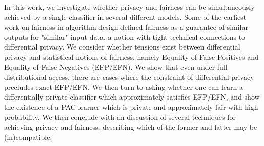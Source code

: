 
In this work, we investigate whether privacy and fairness can be simultaneously achieved by a single classifier in several different models. Some of the earliest work on fairness in algorithm design defined fairness as a guarantee of similar outputs for "similar" input data, a notion with tight technical connections to differential privacy. We consider whether tensions exist between differential privacy and statistical notions of fairness, namely Equality of False Positives and Equality of False Negatives (EFP/EFN). We show that even under full distributional access, there are cases where the constraint of differential privacy precludes exact EFP/EFN. We then turn to asking whether one can learn a differentially private classifier which approximately satisfies EFP/EFN, and show the existence of a PAC learner which is private and approximately fair with high probability. We then conclude with an discussion of several techniques for achieving privacy and fairness, describing which of the former and latter may be (in)compatible.